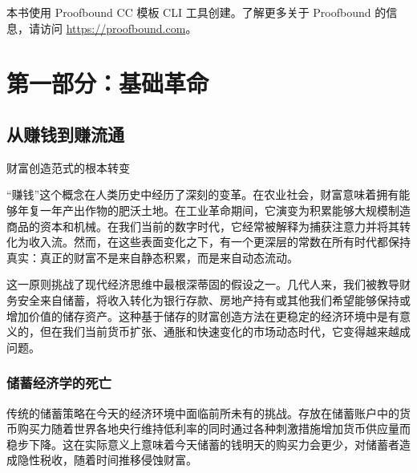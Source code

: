 \documentclass[
  Letterpaper,
]{scrbook}
\begin{document}
\begin{tcolorbox}[enhanced jigsaw, left=2mm, titlerule=0mm, colback=white, breakable, opacityback=0, colbacktitle=quarto-callout-note-color!10!white, bottomrule=.15mm, colframe=quarto-callout-note-color-frame, rightrule=.15mm, coltitle=black, title=\textcolor{quarto-callout-note-color}{\faInfo}\hspace{0.5em}{关于本书}, toptitle=1mm, bottomtitle=1mm, opacitybacktitle=0.6, toprule=.15mm, arc=.35mm, leftrule=.75mm]

本书使用 Proofbound CC 模板 CLI 工具创建。了解更多关于 Proofbound
的信息，请访问 \url{https://proofbound.com}。

\end{tcolorbox}

\part{第一部分：基础革命}

\chapter{从赚钱到赚流通}\label{sec-earning-circulation}

财富创造范式的根本转变

``赚钱''这个概念在人类历史中经历了深刻的变革。在农业社会，财富意味着拥有能够年复一年产出作物的肥沃土地。在工业革命期间，它演变为积累能够大规模制造商品的资本和机械。在我们当前的数字时代，它经常被解释为捕获注意力并将其转化为收入流。然而，在这些表面变化之下，有一个更深层的常数在所有时代都保持真实：真正的财富不是来自静态积累，而是来自动态流动。

这一原则挑战了现代经济思维中最根深蒂固的假设之一。几代人来，我们被教导财务安全来自储蓄，将收入转化为银行存款、房地产持有或其他我们希望能够保持或增加价值的储存资产。这种基于储存的财富创造方法在更稳定的经济环境中是有意义的，但在我们当前货币扩张、通胀和快速变化的市场动态时代，它变得越来越成问题。

\section{储蓄经济学的死亡}\label{ux50a8ux84c4ux7ecfux6d4eux5b66ux7684ux6b7bux4ea1}

传统的储蓄策略在今天的经济环境中面临前所未有的挑战。存放在储蓄账户中的货币购买力随着世界各地央行维持低利率的同时通过各种刺激措施增加货币供应量而稳步下降。这在实际意义上意味着今天储蓄的钱明天的购买力会更少，对储蓄者造成隐性税收，随着时间推移侵蚀财富。
\end{document}
